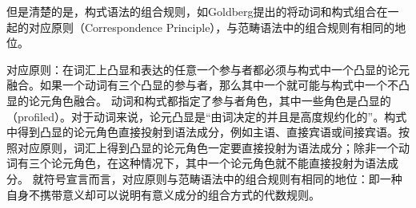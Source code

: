 但是清楚的是，构式语法的组合规则，如Goldberg提出的将动词和构式组合在一起的对应原则（Correspondence Principle）\citeyearpar[]{Goldberg95a}，与范畴语法中的组合规则有相同的地位。

\ea
对应原则：在词汇上凸显和表达的任意一个参与者都必须与构式中一个凸显的论元融合。如果一个动词有三个凸显的参与者，那么其中一个就可能与构式中一个不凸显的论元角色融合。\citep[]{Goldberg95a}\label{tcp}
\z
动词和构式都指定了参与者角色，其中一些角色是凸显的（profiled）。对于动词来说，论元凸显是“由词决定的并且是高度规约化的”\citep[]{Goldberg95a}。构式中得到凸显的论元角色直接投射到语法成分，例如主语、直接宾语或间接宾语。按照对应原则，词汇上得到凸显的论元角色一定要直接投射为语法成分；除非一个动词有三个论元角色，在这种情况下，其中一个论元角色就不能直接投射为语法成分。
就符号宣言而言，对应原则与范畴语法中的组合规则有相同的地位：即一种自身不携带意义却可以说明有意义成分的组合方式的代数规则。

